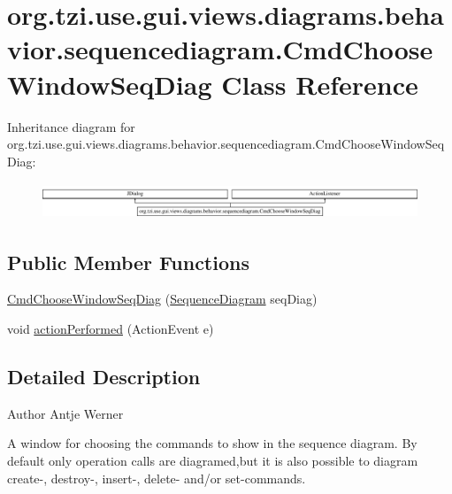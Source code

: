 \hypertarget{classorg_1_1tzi_1_1use_1_1gui_1_1views_1_1diagrams_1_1behavior_1_1sequencediagram_1_1_cmd_choose_window_seq_diag}{\section{org.\-tzi.\-use.\-gui.\-views.\-diagrams.\-behavior.\-sequencediagram.\-Cmd\-Choose\-Window\-Seq\-Diag Class Reference}
\label{classorg_1_1tzi_1_1use_1_1gui_1_1views_1_1diagrams_1_1behavior_1_1sequencediagram_1_1_cmd_choose_window_seq_diag}
}
Inheritance diagram for org.\-tzi.\-use.\-gui.\-views.\-diagrams.\-behavior.\-sequencediagram.\-Cmd\-Choose\-Window\-Seq\-Diag\-:\begin{figure}[H]
\begin{center}
\leavevmode
\includegraphics[height=1.095890cm]{classorg_1_1tzi_1_1use_1_1gui_1_1views_1_1diagrams_1_1behavior_1_1sequencediagram_1_1_cmd_choose_window_seq_diag}
\end{center}
\end{figure}
\subsection*{Public Member Functions}
\begin{DoxyCompactItemize}
\item 
\hyperlink{classorg_1_1tzi_1_1use_1_1gui_1_1views_1_1diagrams_1_1behavior_1_1sequencediagram_1_1_cmd_choose_window_seq_diag_a89bd54aa40d70f59e473f1a4443e52f9}{Cmd\-Choose\-Window\-Seq\-Diag} (\hyperlink{classorg_1_1tzi_1_1use_1_1gui_1_1views_1_1diagrams_1_1behavior_1_1sequencediagram_1_1_sequence_diagram}{Sequence\-Diagram} seq\-Diag)
\item 
void \hyperlink{classorg_1_1tzi_1_1use_1_1gui_1_1views_1_1diagrams_1_1behavior_1_1sequencediagram_1_1_cmd_choose_window_seq_diag_a30060c9f797620b4f71d7c785699f6dc}{action\-Performed} (Action\-Event e)
\end{DoxyCompactItemize}


\subsection{Detailed Description}
\begin{DoxyAuthor}{Author}
Antje Werner \begin{DoxyVerb}    A window for choosing the commands to show in the sequence diagram.
    By default only operation calls are diagramed,but it is also possible
    to diagram create-, destroy-, insert-, delete- and/or set-commands.\end{DoxyVerb}
 
\end{DoxyAuthor}


